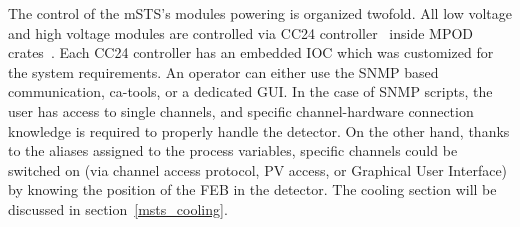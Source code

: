The control of the \gls{mSTS}'s modules powering is organized twofold. All low voltage and high voltage modules are controlled via CC24 controller~\cite{cc24} inside MPOD crates~\cite{mpod}. Each CC24 controller has an embedded \gls{IOC} which was customized for the system requirements.  An operator can either use the \gls{SNMP} based communication, ca-tools, or a dedicated \gls{GUI}. In the case of SNMP scripts, the user has access to single channels, and specific channel-hardware connection knowledge is required to properly handle the detector. On the other hand, thanks to the aliases assigned to the process variables, specific channels could be switched on (via channel access protocol, PV access, or Graphical User Interface) by knowing the position of the \gls{FEB} in the detector. The cooling section will be discussed in section~\ref{msts_cooling}.

